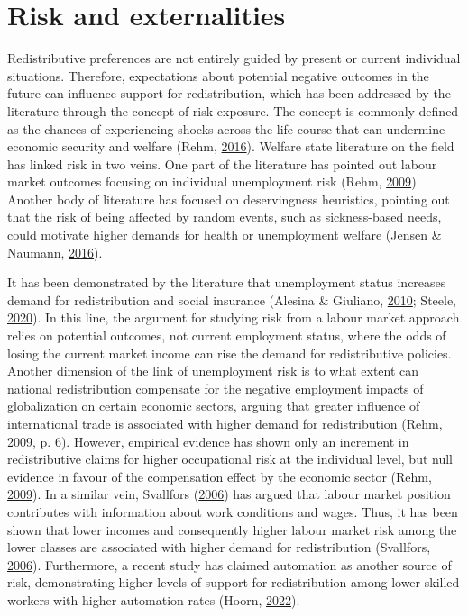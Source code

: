 \documentclass[
  12pt,
]{book}
\begin{document}
\hypertarget{risk-and-externalities}{%
\section{Risk and externalities}\label{risk-and-externalities}}

Redistributive preferences are not entirely guided by present or current individual situations. Therefore, expectations about potential negative outcomes in the future can influence support for redistribution, which has been addressed by the literature through the concept of risk exposure. The concept is commonly defined as the chances of experiencing shocks across the life course that can undermine economic security and welfare (Rehm, \protect\hyperlink{ref-rehm_risk_2016}{2016}). Welfare state literature on the field has linked risk in two veins. One part of the literature has pointed out labour market outcomes focusing on individual unemployment risk (Rehm, \protect\hyperlink{ref-rehm_risks_2009}{2009}). Another body of literature has focused on deservingness heuristics, pointing out that the risk of being affected by random events, such as sickness-based needs, could motivate higher demands for health or unemployment welfare (Jensen \& Naumann, \protect\hyperlink{ref-Jensenux5cux26Nauman2016}{2016}).

It has been demonstrated by the literature that unemployment status increases demand for redistribution and social insurance (Alesina \& Giuliano, \protect\hyperlink{ref-alesina_preferences_2010}{2010}; Steele, \protect\hyperlink{ref-steele_wealth_2020}{2020}). In this line, the argument for studying risk from a labour market approach relies on potential outcomes, not current employment status, where the odds of losing the current market income can rise the demand for redistributive policies. Another dimension of the link of unemployment risk is to what extent can national redistribution compensate for the negative employment impacts of globalization on certain economic sectors, arguing that greater influence of international trade is associated with higher demand for redistribution (Rehm, \protect\hyperlink{ref-rehm_risks_2009}{2009}, p. 6). However, empirical evidence has shown only an increment in redistributive claims for higher occupational risk at the individual level, but null evidence in favour of the compensation effect by the economic sector (Rehm, \protect\hyperlink{ref-rehm_risks_2009}{2009}). In a similar vein, Svallfors (\protect\hyperlink{ref-Svallfors2006}{2006}) has argued that labour market position contributes with information about work conditions and wages. Thus, it has been shown that lower incomes and consequently higher labour market risk among the lower classes are associated with higher demand for redistribution (Svallfors, \protect\hyperlink{ref-Svallfors2006}{2006}). Furthermore, a recent study has claimed automation as another source of risk, demonstrating higher levels of support for redistribution among lower-skilled workers with higher automation rates (Hoorn, \protect\hyperlink{ref-hoorn_automatability_2022}{2022}).
\end{document}
